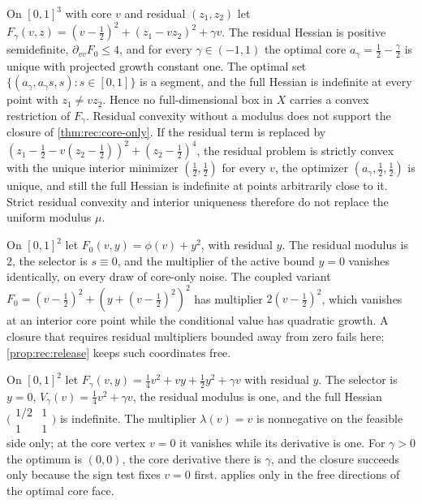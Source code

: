 \begin{example}\label{ex:rec:fiber}
On $[0,1]^3$ with core $v$ and residual $(z_1,z_2)$ let
$F_\gamma(v,z)=(v-\frac12)^2+(z_1-vz_2)^2+\gamma v$. The residual Hessian is
positive semidefinite, $\partial_{vv}F_0\le4$, and for every
$\gamma\in(-1,1)$ the optimal core $a_\gamma=\frac12-\frac\gamma2$ is unique
with projected growth constant one. The optimal set
$\{(a_\gamma,a_\gamma s,s):s\in[0,1]\}$ is a segment, and the full Hessian is
indefinite at every point with $z_1\ne vz_2$. Hence no full-dimensional box
in $X$ carries a convex restriction of $F_\gamma$. Residual convexity without
a modulus does not support the closure of \cref{thm:rec:core-only}. If the
residual term is replaced by $(z_1-\frac12-v(z_2-\frac12))^2+(z_2-\frac12)^4$,
the residual problem is strictly convex with the unique interior minimizer
$(\frac12,\frac12)$ for every $v$, the optimizer
$(a_\gamma,\frac12,\frac12)$ is unique, and still the full Hessian is
indefinite at points arbitrarily close to it. Strict residual convexity and
interior uniqueness therefore do not replace the uniform modulus $\mu$.
\end{example}

\begin{example}\label{ex:rec:weak}
On $[0,1]^2$ let $F_0(v,y)=\phi(v)+y^2$, with residual $y$. The residual
modulus is $2$, the selector is $s\equiv0$, and the multiplier of the active
bound $y=0$ vanishes identically, on every draw of core-only noise. The
coupled variant $F_0=(v-\frac12)^2+(y+(v-\frac12)^2)^2$ has multiplier
$2(v-\frac12)^2$, which vanishes at an interior core point while the
conditional value has quadratic growth. A closure that requires residual
multipliers bounded away from zero fails here; \cref{prop:rec:release} keeps
such coordinates free.
\end{example}

\begin{example}\label{ex:rec:two-sided}
On $[0,1]^2$ let $F_\gamma(v,y)=\frac14v^2+vy+\frac12y^2+\gamma v$ with
residual $y$. The selector is $y=0$, $V_\gamma(v)=\frac14v^2+\gamma v$, the
residual modulus is one, and the full Hessian
$\bigl(\begin{smallmatrix}1/2&1\\1&1\end{smallmatrix}\bigr)$ is indefinite.
The multiplier $\lambda(v)=v$ is nonnegative on the feasible side only; at
the core vertex $v=0$ it vanishes while its derivative is one. For
$\gamma>0$ the optimum is $(0,0)$, the core derivative there is $\gamma$, and
the closure succeeds only because the sign test fixes $v=0$ first.
 applies only in the free directions of the optimal
core face.
\end{example}

